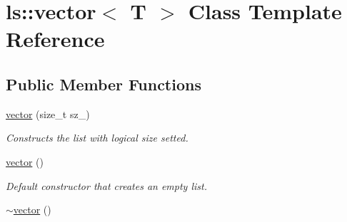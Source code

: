 \hypertarget{classls_1_1vector}{}\section{ls\+:\+:vector$<$ T $>$ Class Template Reference}
\label{classls_1_1vector}
\subsection*{Public Member Functions}
\begin{DoxyCompactItemize}
\item 
\hyperlink{classls_1_1vector_ac88b18c028485be68b3916bde93d7e19}{vector} (size\+\_\+t sz\+\_\+)
\begin{DoxyCompactList}\small\item\em Constructs the list with logical size setted. \end{DoxyCompactList}\item 
\hyperlink{classls_1_1vector_a28ed60409cde794caea6a40ec8d832b2}{vector} ()\hypertarget{classls_1_1vector_a28ed60409cde794caea6a40ec8d832b2}{}\label{classls_1_1vector_a28ed60409cde794caea6a40ec8d832b2}

\begin{DoxyCompactList}\small\item\em Default constructor that creates an empty list. \end{DoxyCompactList}\item 
\hyperlink{classls_1_1vector_a7f8c4cd49dff8799dd98cb3e84242eda}{$\sim$vector} ()\hypertarget{classls_1_1vector_a7f8c4cd49dff8799dd98cb3e84242eda}{}\label{classls_1_1vector_a7f8c4cd49dff8799dd98cb3e84242eda}


\end{DoxyCompactItemize}
